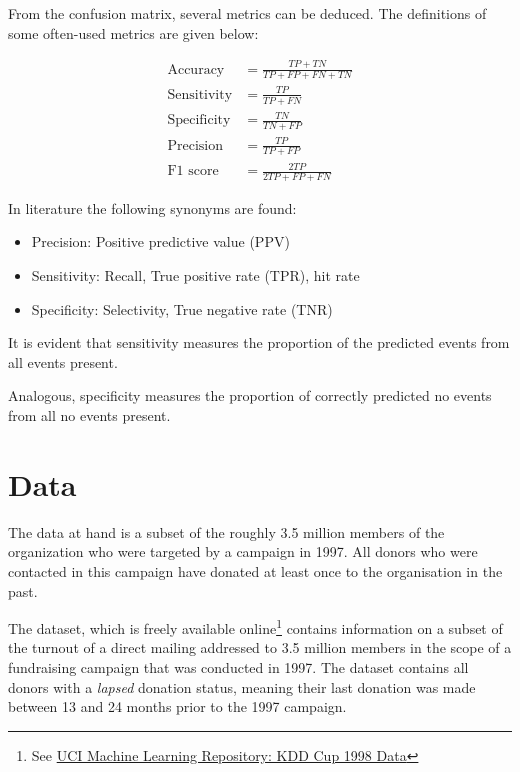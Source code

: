 \documentclass[
  11pt,
  a4paper,
  DIV=12,captions=tableheading,oneside]{scrbook}
\providecommand{\tightlist}{%
  \setlength{\itemsep}{0pt}\setlength{\parskip}{0pt}}
\providecommand{\tightlist}{%
  \setlength{\itemsep}{0pt}\setlength{\parskip}{0pt}}
\begin{document}
From the confusion matrix, several metrics can be deduced. The definitions of some often-used metrics are given below:

\begin{align*}
\text{Accuracy} &= \frac{TP + TN}{TP + FP + FN + TN} \\
\text{Sensitivity} &= \frac{TP}{TP + FN} \\
\text{Specificity} &= \frac{TN}{TN + FP} \\
\text{Precision} &= \frac{TP}{TP + FP} \\
\text{F1 score} &= \frac{2TP}{2TP+FP+FN}
\end{align*}

In literature the following synonyms are found:

\begin{itemize}
\tightlist
\item
  Precision: Positive predictive value (PPV)
\item
  Sensitivity: Recall, True positive rate (TPR), hit rate
\item
  Specificity: Selectivity, True negative rate (TNR)
\end{itemize}

It is evident that sensitivity measures the proportion of the predicted events from all events present.

Analogous, specificity measures the proportion of correctly predicted no events from all no events present.

\hypertarget{data}{%
\chapter{Data}\label{data}}

The data at hand is a subset of the roughly 3.5 million members of the organization who were targeted by a campaign in 1997. All donors who were contacted in this campaign have donated at least once to the organisation in the past.

The dataset, which is freely available online\footnote{See \href{https://archive.ics.uci.edu/ml/datasets/KDD+Cup+1998+Data}{UCI Machine Learning Repository: KDD Cup 1998 Data}} contains information on a subset of the turnout of a direct mailing addressed to 3.5 million members in the scope of a fundraising campaign that was conducted in 1997. The dataset contains all donors with a \emph{lapsed} donation status, meaning their last donation was made between 13 and 24 months prior to the 1997 campaign.
\end{document}
